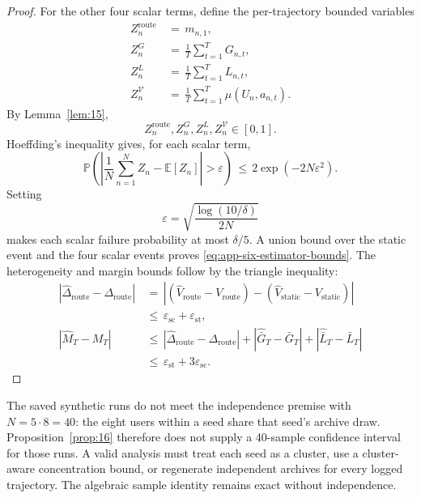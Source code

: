\documentclass{article} %
\begin{document}
\begin{proof}
For the other four scalar terms, define the per-trajectory bounded variables
\begin{align}
\label{eq:app-six-proof-Z-defs}
Z_n^{\mathrm{route}}
&\,=\,
m_{n,1},
\\
Z_n^{G}
&\,=\,
\frac{1}{T}\sum_{t=1}^{T}G_{n,t},
\\
Z_n^{L}
&\,=\,
\frac{1}{T}\sum_{t=1}^{T}L_{n,t},
\\
Z_n^{\mathcal{V}}
&\,=\,
\frac{1}{T}\sum_{t=1}^{T}\mu(U_n,a_{n,t}).
\end{align}
By Lemma~\ref{lem:15},
\begin{equation}
\label{eq:app-six-proof-Z-bounded}
Z_n^{\mathrm{route}},
Z_n^{G},
Z_n^{L},
Z_n^{\mathcal{V}}
\in[0,1].
\end{equation}
Hoeffding's inequality gives, for each scalar term,
\begin{equation}
\label{eq:app-six-proof-scalar-hoeffding}
\mathbb{P}\!\left(
\left|
\frac{1}{N}\sum_{n=1}^{N}Z_n-\mathbb{E}[Z_n]
\right|>\varepsilon
\right)
\,\le\,
2\exp(-2N\varepsilon^2).
\end{equation}
Setting
\begin{equation}
\label{eq:app-six-proof-scalar-eps}
\varepsilon
=
\sqrt{\frac{\log(10/\delta)}{2N}}
\end{equation}
makes each scalar failure probability at most \(\delta/5\).  A union bound over the static event and the four scalar events proves \eqref{eq:app-six-estimator-bounds}.  The heterogeneity and margin bounds follow by the triangle inequality:
\begin{align}
\label{eq:app-six-proof-delta-triangle}
\left|
\widehat\Delta_{\mathrm{route}}-\Delta_{\mathrm{route}}
\right|
&\,=\,
\left|
(\widehat V_{\mathrm{route}}-V_{\mathrm{route}})
-
(\widehat V_{\mathrm{static}}-V_{\mathrm{static}})
\right|
\\
&\,\le\,
\varepsilon_{\mathrm{sc}}
+
\varepsilon_{\mathrm{st}},
\\
|\widehat M_T-M_T|
&\,\le\,
|\widehat\Delta_{\mathrm{route}}-\Delta_{\mathrm{route}}|
+
|\widehat{\bar G}_T-\bar G_T|
+
|\widehat{\bar L}_T-\bar L_T|
\\
&\,\le\,
\varepsilon_{\mathrm{st}}+3\varepsilon_{\mathrm{sc}}.
\end{align}
\end{proof}

The saved synthetic runs do not meet the independence premise with
$N=5\cdot8=40$: the eight users within a seed share that seed's archive draw.
Proposition~\ref{prop:16} therefore does not supply a 40-sample confidence
interval for those runs. A valid analysis must treat each seed as a cluster,
use a cluster-aware concentration bound, or regenerate independent archives
for every logged trajectory. The algebraic sample identity remains exact
without independence.
\end{document}

